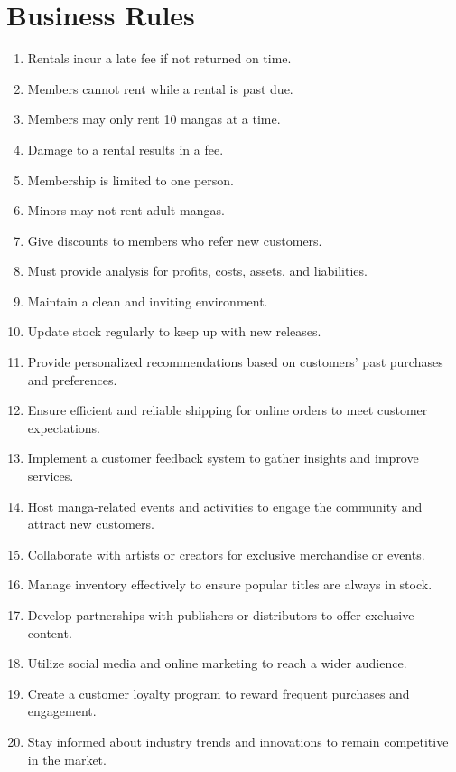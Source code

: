 \documentclass{article}
\begin{document}
\section*{Business Rules}

\begin{enumerate}
\item Rentals incur a late fee if not returned on time.
\item Members cannot rent while a rental is past due.
\item Members may only rent 10 mangas at a time.
\item Damage to a rental results in a fee.
\item Membership is limited to one person.
\item Minors may not rent adult mangas.
\item Give discounts to members who refer new customers.
\item Must provide analysis for profits, costs, assets, and liabilities.
\item Maintain a clean and inviting environment.
\item Update stock regularly to keep up with new releases.
\item Provide personalized recommendations based on customers' past purchases and preferences.
\item Ensure efficient and reliable shipping for online orders to meet customer expectations.
\item Implement a customer feedback system to gather insights and improve services.
\item Host manga-related events and activities to engage the community and attract new customers.
\item Collaborate with artists or creators for exclusive merchandise or events.
\item Manage inventory effectively to ensure popular titles are always in stock.
\item Develop partnerships with publishers or distributors to offer exclusive content.
\item Utilize social media and online marketing to reach a wider audience.
\item Create a customer loyalty program to reward frequent purchases and engagement.
\item Stay informed about industry trends and innovations to remain competitive in the market.
\end{enumerate}
\end{document}
